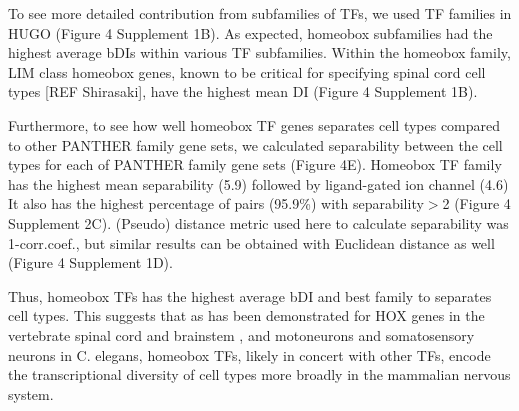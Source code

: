 To see more detailed contribution from subfamilies of TFs, we used TF families in HUGO (Figure 4 Supplement 1B). As expected, homeobox subfamilies had the highest average bDIs within various TF subfamilies. Within the homeobox family, LIM class homeobox genes, known to be critical for specifying spinal cord cell types [REF Shirasaki], have the highest mean DI (Figure 4 Supplement 1B). 

Furthermore, to see how well homeobox TF genes separates cell types compared to other PANTHER family gene sets, 
we calculated separability between the cell types for each of PANTHER family gene sets (Figure 4E). Homeobox TF family has the highest mean separability (5.9) followed by ligand-gated ion channel (4.6) It also has the highest percentage of pairs (95.9\%) with separability$>$2 (Figure 4 Supplement 2C). (Pseudo) distance metric used here to calculate separability was 1-corr.coef., but similar results can be obtained with Euclidean distance as well (Figure 4 Supplement 1D). 

Thus, homeobox TFs has the highest average bDI and best family to separates cell types. This suggests that as has been demonstrated for HOX genes in the vertebrate spinal cord and brainstem \cite{Dasen_2009,Philippidou_2013}, and motoneurons \cite{Kratsios_2017} and somatosensory neurons \cite{Zheng_2015} in C. elegans, homeobox TFs, likely in concert with other TFs, encode the transcriptional diversity of cell types more broadly in the mammalian nervous system.
